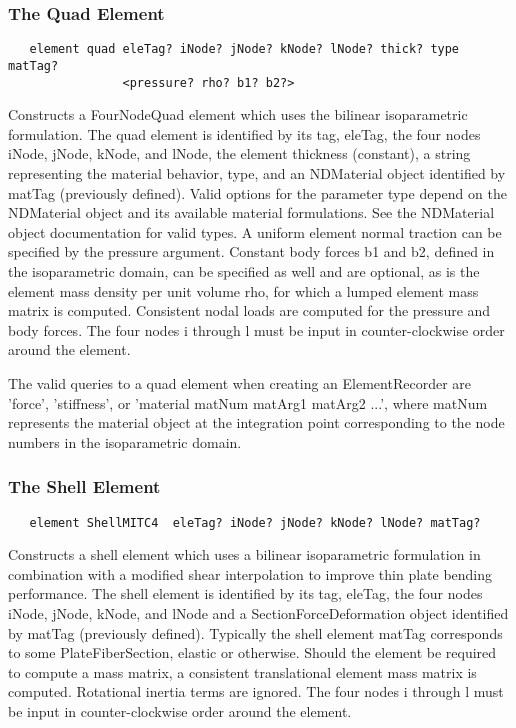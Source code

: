 \documentclass[12pt]{article}
\begin{document}


\subsubsection{The Quad Element}
{\sf\small
\begin{verbatim}
   element quad eleTag? iNode? jNode? kNode? lNode? thick? type matTag? 
                <pressure? rho? b1? b2?>
\end{verbatim}
}

\noindent Constructs a FourNodeQuad element which uses the bilinear
isoparametric formulation. The quad element is identified by its tag,
eleTag, the four nodes iNode, jNode, kNode, and lNode, the element
thickness (constant), a string representing the material behavior,
type, and an NDMaterial object identified by matTag (previously
defined). Valid options for the parameter type depend on the
NDMaterial object and its available material formulations. See the
NDMaterial object documentation for valid types. A uniform element
normal traction can be specified by the pressure argument. Constant
body forces b1 and b2, defined in the isoparametric domain, can be
specified as well and are optional, as is the element mass density per
unit volume rho, for which a lumped element mass matrix is
computed. Consistent nodal loads are computed for the pressure and
body forces. The four nodes i through l must be input in
counter-clockwise order around the element.

The valid queries to a quad element when creating an ElementRecorder
are 'force', 'stiffness', or 'material matNum matArg1 matArg2 ...',  where matNum
represents the material object at the integration point corresponding to the node numbers
in the isoparametric domain.


\subsubsection{The Shell Element}
{\sf\small
\begin{verbatim}
   element ShellMITC4  eleTag? iNode? jNode? kNode? lNode? matTag? 
\end{verbatim}
}

\noindent 
Constructs a shell element which uses a bilinear
isoparametric formulation in combination with a modified shear
interpolation to improve thin plate bending performance. 
The shell element is identified by its tag,
eleTag, the four nodes iNode, jNode, kNode, and lNode 
and a SectionForceDeformation object identified by matTag (previously
defined). 
Typically the shell element matTag corresponds to some PlateFiberSection,
elastic or otherwise.
Should the element be required to compute a mass matrix, a consistent 
translational element mass matrix is computed.  Rotational inertia terms 
are ignored.
The four nodes i through l must be input in
counter-clockwise order around the element.
\end{document}
